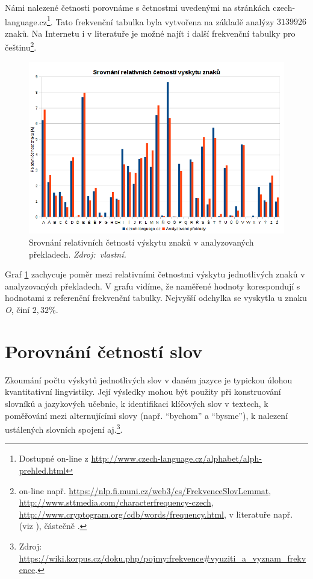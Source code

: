 \documentclass[dp.tex]{subfiles}
\begin{document}
Námi nalezené četnosti porovnáme s četnostmi uvedenými na stránkách czech-language.cz\footnote{Dostupné on-line z \url{http://www.czech-language.cz/alphabet/alph-prehled.html}}. Tato frekvenční tabulka byla vytvořena na základě analýzy $3 139 926$ znaků. Na Internetu i v literatuře je možné najít i další frekvenční tabulky pro češtinu\footnote{on-line např. \url{https://nlp.fi.muni.cz/web3/cs/FrekvenceSlovLemmat}, \url{http://www.sttmedia.com/characterfrequency-czech}, \url{http://www.cryptogram.org/cdb/words/frequency.html}, v literatuře např.  (viz \cite{Kraus1965}), částečně  \cite[str.~109-121]{Tesitelova1987}.}.

\begin{figure}[h!]
	\centering
	\includegraphics[max width=\textwidth,keepaspectratio=true]{imgs-70-prakticka/cetnost-znaku2}
	\caption[Srovnání relativních četností výskytu znaků v analyzovaných překladech.]{Srovnání relativních četností výskytu znaků v analyzovaných překladech. \textit{Zdroj:~vlastní.}}
	\label{fig:character-freq}
\end{figure}

Graf \ref{fig:character-freq} zachycuje poměr mezi relativními četnostmi výskytu jednotlivých znaků v analyzovaných překladech. V grafu vidíme, že naměřené hodnoty korespondují s hodnotami z referenční frekvenční tabulky. Nejvyšší odchylka se vyskytla u znaku \textit{O}, činí $2,32 \%$.

\section{Porovnání četností slov}

Zkoumání počtu výskytů jednotlivých slov v daném jazyce je typickou úlohou kvantitativní lingvistiky. Její výsledky mohou být použity při konstruování slovníků a jazykových učebnic, k identifikaci klíčových slov v textech, k poměřování mezi alternujícími slovy (např. \enquote{bychom} a \enquote{bysme}), k nalezení ustálených slovních spojení aj.\footnote{Zdroj: \url{https://wiki.korpus.cz/doku.php/pojmy:frekvence\#vyuziti_a_vyznam_frekvence}.}.
\end{document}
